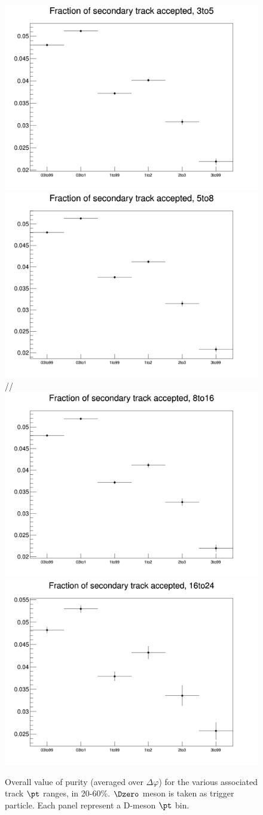 \begin{figure}
\centering
{\includegraphics[width=0.45\linewidth]{figuresVsCent/Global/Purity/Output_Plots_20_60_DCA100/FractOfSecOverTotal_3to5.png}}
{\includegraphics[width=0.45\linewidth]{figuresVsCent/Global/Purity/Output_Plots_20_60_DCA100/FractOfSecOverTotal_5to8.png}} //
{\includegraphics[width=0.45\linewidth]{figuresVsCent/Global/Purity/Output_Plots_20_60_DCA100/FractOfSecOverTotal_8to16.png}}
{\includegraphics[width=0.45\linewidth]{figuresVsCent/Global/Purity/Output_Plots_20_60_DCA100/FractOfSecOverTotal_16to24.png}}
 \caption{Overall value of purity (averaged over $\Delta\varphi$) for the various associated track $\pt$ ranges, in 20-60\%. $\Dzero$ meson is taken as trigger particle. Each panel represent a D-meson $\pt$ bin.}
\label{fig:PurityFlat2060}
\end{figure}

